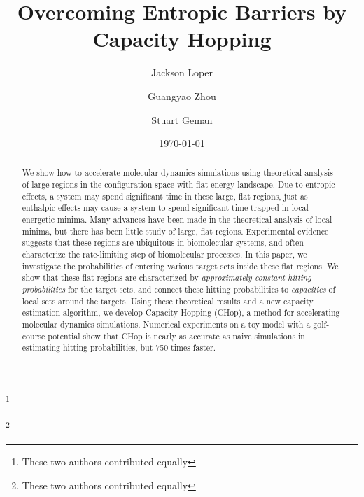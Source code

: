 \documentclass[english, aip, jcp, priprint, graphicx,floatfix]{revtex4-1}
\theoremstyle{plain}
\theoremstyle{definition}
\theoremstyle{plain}
\begin{document}
\title{Overcoming Entropic Barriers by Capacity Hopping} %

\author{Jackson Loper}
\thanks{These two authors contributed equally}

\author{Guangyao Zhou}
\thanks{These two authors contributed equally}

\author{Stuart Geman}

\date{\today}

\begin{abstract}
	We show how to accelerate molecular dynamics simulations using theoretical analysis of large regions in the configuration space with flat energy landscape. Due to entropic effects, a system may spend significant time in these large, flat regions, just as enthalpic effects may cause a system to spend significant time trapped in local energetic minima.  Many advances have been made in the theoretical analysis of local minima, but there has been little study of large, flat regions. Experimental evidence suggests that these regions are ubiquitous in biomolecular systems, and often characterize the rate-limiting step of biomolecular processes.  In this paper, we investigate the probabilities of entering various target sets inside these flat regions. We show that these flat regions are characterized by \emph{approximately constant hitting probabilities} for the target sets, and connect these hitting probabilities to \textit{capacities} of local sets around the targets.  Using these theoretical results and a new capacity estimation algorithm, we develop Capacity Hopping (CHop), a method for accelerating molecular dynamics simulations. Numerical experiments on a toy model with a golf-course potential show that CHop is nearly as accurate as naive simulations in estimating hitting probabilities, but 750 times faster.
\end{abstract}

\pacs{}%

\maketitle %
\end{document}
